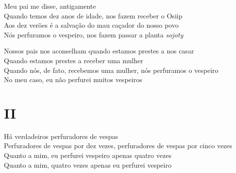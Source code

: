 \begin{linenumbers}\begingroup\raggedright
 \noindent Meu pai me disse, antigamente\\
 Quando temos dez anos de idade, nos fazem receber o Osiip\\
 Aos dez verões é a salvação do mau caçador do nosso povo\\
 Nós perfuramos o vespeiro, nos fazem passar a planta \textit{sojoty}

\end{linenumbers}\endgroup

\bigskip

\begin{linenumbers}\begingroup\raggedright
 
\noindent Nossos pais nos aconselham quando estamos prestes a nos casar\\
 Quando estamos prestes a receber uma mulher\\
 Quando nós, de fato, recebemos uma mulher, nós perfuramos o vespeiro\\
 No meu caso, eu não perfurei muitos vespeiros
 
 
\medskip
\section{II}

 \noindent Há verdadeiros perfuradores de vespas\\
 Perfuradores de vespas por dez vezes, perfuradores de vespas por cinco vezes\\
 Quanto a mim, eu perfurei vespeiro apenas quatro vezes\\
 Quanto a mim, quatro vezes apenas eu perfurei vespeiro
 
\end{linenumbers}\endgroup

